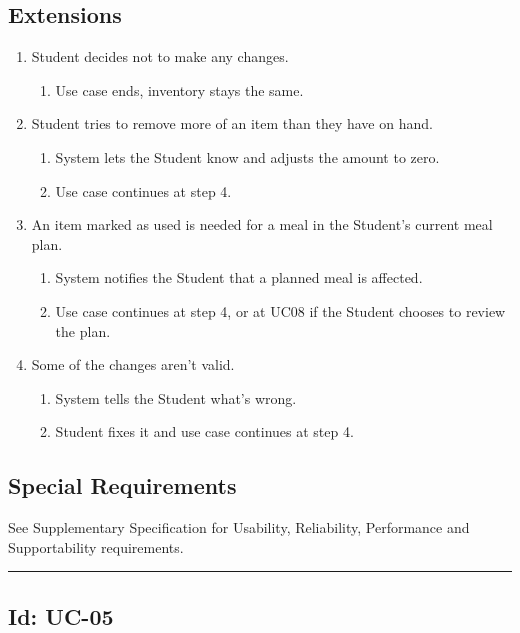 \documentclass[10pt,letterpaper]{article}
\newcommand{\ucseparator}{\vspace{1em}\noindent\rule{\linewidth}{0.4pt}\vspace{1.5em}}
\begin{document}
\subsection*{Extensions}
\begin{enumerate}
    \item[3a.] Student decides not to make any changes.
    \begin{enumerate}
        \item[1.] Use case ends, inventory stays the same.
    \end{enumerate}
    \item[3b.] Student tries to remove more of an item than they have on hand.
    \begin{enumerate}
        \item[1.] System lets the Student know and adjusts the amount to zero.
        \item[2.] Use case continues at step 4.
    \end{enumerate}
    \item[3c.] An item marked as used is needed for a meal in the Student's current meal plan.
    \begin{enumerate}
        \item[1.] System notifies the Student that a planned meal is affected.
        \item[2.] Use case continues at step 4, or at UC08 if the Student chooses to review the plan.
    \end{enumerate}
    \item[5a.] Some of the changes aren't valid.
    \begin{enumerate}
        \item[1.] System tells the Student what's wrong.
        \item[2.] Student fixes it and use case continues at step 4.
    \end{enumerate}
\end{enumerate}

\subsection*{Special Requirements}
See Supplementary Specification for Usability, Reliability, Performance and Supportability requirements.

\ucseparator

\subsection*{Id: UC-05}
\end{document}
